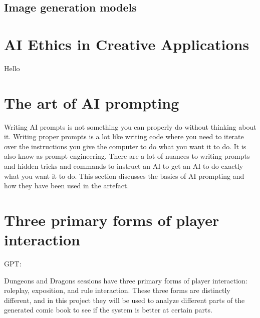 \subsection{Image generation models} 

\cite{bie2024renaissance}


\section{AI Ethics in Creative Applications} \label{AIethics}
Hello

\section{The art of AI prompting}
Writing AI prompts is not something you can properly do without thinking about it. Writing proper prompts is a lot like writing code where you need to iterate over the instructions you give the computer to do what you want it to do. It is also know as prompt engineering. There are a lot of nuances to writing prompts and hidden tricks and commands to instruct an AI to get an AI to do exactly what you want it to do. This section discusses the basics of AI prompting and how they have been used in the artefact.

\cite{dang2022prompt}

\section{Three primary forms of player interaction}
GPT:

Dungeons and Dragons sessions have three primary forms of player interaction: roleplay, exposition, and rule interaction. These three forms are distinctly different, and in this project they will be used to analyze different parts of the generated comic book to see if the system is better at certain parts.

